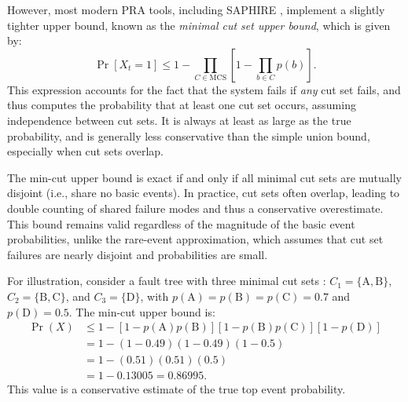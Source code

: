 However, most modern PRA tools, including SAPHIRE \cite{saphire1}, implement a slightly tighter upper bound, known as the \emph{minimal cut set upper bound}, which is given by:
\begin{equation}
\label{eq:mcub}
\Pr\left[X_t = 1\right] \leq 1 - \prod_{C \in \mathrm{MCS}} \left[1 - \prod_{b \in C} p(b)\right].
\end{equation}
This expression accounts for the fact that the system fails if \emph{any} cut set fails, and thus computes the probability that at least one cut set occurs, assuming independence between cut sets. It is always at least as large as the true probability, and is generally less conservative than the simple union bound, especially when cut sets overlap.

The min-cut upper bound is exact if and only if all minimal cut sets are mutually disjoint (i.e., share no basic events). In practice, cut sets often overlap, leading to double counting of shared failure modes and thus a conservative overestimate. This bound remains valid regardless of the magnitude of the basic event probabilities, unlike the rare-event approximation, which assumes that cut set failures are nearly disjoint and probabilities are small.

For illustration, consider a fault tree with three minimal cut sets \cite{saphire_manual}: $C_1 = \{\text{A}, \text{B}\}$, $C_2 = \{\text{B}, \text{C}\}$, and $C_3 = \{\text{D}\}$, with $p(\text{A}) = p(\text{B}) = p(\text{C}) = 0.7$ and $p(\text{D}) = 0.5$. The min-cut upper bound is:
\begin{align}
\Pr(X) &\leq 1 - \left[1 - p(\text{A})p(\text{B})\right]\left[1 - p(\text{B})p(\text{C})\right]\left[1 - p(\text{D})\right] \\
&= 1 - (1 - 0.49)(1 - 0.49)(1 - 0.5) \\
&= 1 - (0.51)(0.51)(0.5) \\
&= 1 - 0.13005 = 0.86995.
\end{align}
This value is a conservative estimate of the true top event probability.


